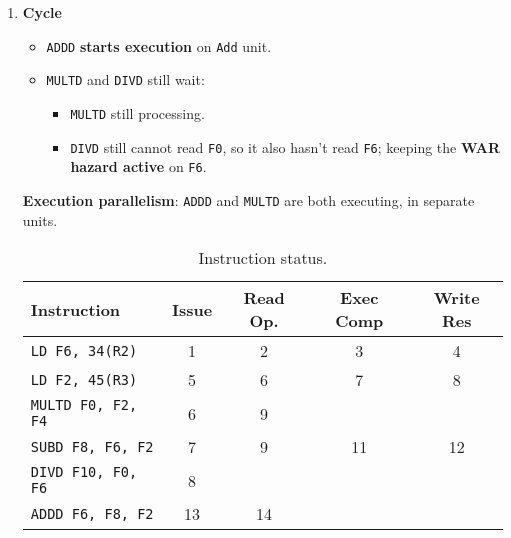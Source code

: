 \begin{enumerate}
    \newpage


    \item \textbf{Cycle \theenumi}
    \begin{itemize}
        \item[\textcolor{Green3}{\faIcon{check}}] \texttt{ADDD} \textbf{starts execution} on \texttt{Add} unit.
        \item \texttt{MULTD} and \texttt{DIVD} still wait:
        \begin{itemize}
            \item \texttt{MULTD} still processing.
            \item \texttt{DIVD} still cannot read \texttt{F0}, so it also hasn't read \texttt{F6}; keeping the \textbf{WAR hazard active} on \texttt{F6}.
        \end{itemize}
    \end{itemize}
    \textbf{Execution parallelism}: \texttt{ADDD} and \texttt{MULTD} are both executing, in separate units.

    \begin{table}[!htp]
        \centering
        \begin{tabular}{@{} l | c c c c @{}}
            \toprule
            Instruction                 & Issue     & Read Op.  & Exec Comp & Write Res \\
            \midrule
            \texttt{LD    F6, 34(R2)}   & 1         & 2         & 3         & 4         \\ [.3em]
            \texttt{LD    F2, 45(R3)}   & 5         & 6         & 7         & 8         \\ [.3em]
            \texttt{MULTD F0, F2, F4}   & 6         & 9         &           &           \\ [.3em]
            \texttt{SUBD  F8, F6, F2}   & 7         & 9         & 11        & 12        \\ [.3em]
            \texttt{DIVD  F10, F0, F6}  & 8         &           &           &           \\ [.3em]
            \texttt{ADDD  F6, F8, F2}   & 13        & 14        &           &           \\
            \bottomrule
        \end{tabular}
        \caption*{Instruction status.}
    \end{table}


\end{enumerate}
